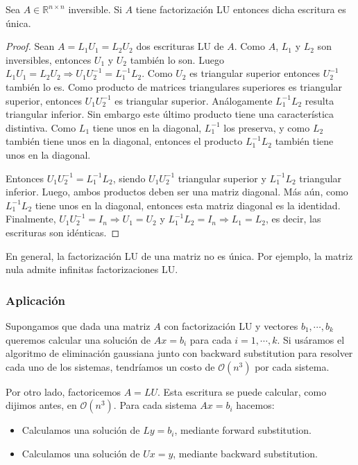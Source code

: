 \begin{propo}
Sea $A \in \mathbb{R}^{n \times n}$ inversible. Si $A$ tiene factorización LU entonces dicha escritura es única.

\begin{proof}
Sean $A = L_1 U_1 = L_2 U_2$ dos escrituras LU de $A$. Como $A$, $L_1$ y $L_2$ son inversibles, entonces $U_1$ y $U_2$ también lo son. Luego $L_1 U_1 = L_2 U_2 \Rightarrow U_1 U_2^{-1} = L_1^{-1} L_2$. Como $U_2$ es triangular superior entonces $U_2^{-1}$ también lo es. Como producto de matrices triangulares superiores es triangular superior, entonces $U_1 U_2^{-1}$ es triangular superior. Análogamente $L_1^{-1} L_2$ resulta triangular inferior. Sin embargo este último producto tiene una característica distintiva. Como $L_1$ tiene unos en la diagonal, $L_1^{-1}$ los preserva, y como $L_2$ también tiene unos en la diagonal, entonces el producto $L_1^{-1} L_2$ también tiene unos en la diagonal.

Entonces $U_1 U_2^{-1} = L_1^{-1} L_2$, siendo $U_1 U_2^{-1}$ triangular superior y $L_1^{-1} L_2$ triangular inferior. Luego, ambos productos deben ser una matriz diagonal. Más aún, como $L_1^{-1} L_2$ tiene unos en la diagonal, entonces esta matriz diagonal es la identidad. Finalmente, $U_1 U_2^{-1} = I_n \Rightarrow U_1 = U_2$ y $L_1^{-1}L_2 = I_n \Rightarrow L_1 = L_2$, es decir, las escrituras son idénticas.

\end{proof}
\end{propo}

\begin{obs}
En general, la factorización LU de una matriz no es única. Por ejemplo, la matriz nula admite infinitas factorizaciones LU.
\end{obs}

\subsubsection{Aplicación}
Supongamos que dada una matriz $A$ con factorización LU y vectores $b_1, \cdots, b_k$ queremos calcular una solución de $Ax = b_i$ para cada $i = 1, \cdots, k$. Si usáramos el algoritmo de eliminación gaussiana junto con backward substitution para resolver cada uno de los sistemas, tendríamos un costo de $\mathcal{O}(n^3)$ por cada sistema.

Por otro lado, factoricemos $A = LU$. Esta escritura se puede calcular, como dijimos antes, en $\mathcal{O}(n^3)$. Para cada sistema $Ax = b_i$ hacemos:
\begin{itemize}
\item Calculamos una solución de $Ly = b_i$, mediante forward substitution.
\item Calculamos una solución de $Ux = y$, mediante backward substitution.
\end{itemize}

